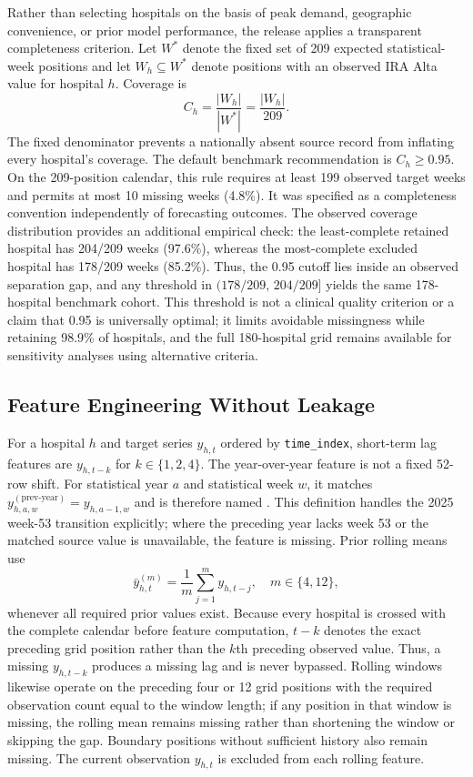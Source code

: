 \documentclass[data,datadescriptor,submit,moreauthors,pdftex]{Definitions/mdpi}
\begin{document}
Rather than selecting hospitals on the basis of peak demand, geographic convenience, or prior model performance, the release applies a transparent completeness criterion. Let $W^{*}$ denote the fixed set of 209 expected statistical-week positions and let $W_h\subseteq W^{*}$ denote positions with an observed IRA Alta value for hospital $h$. Coverage is
\begin{equation}
C_h = \frac{|W_h|}{|W^{*}|}=\frac{|W_h|}{209}.
\end{equation}
The fixed denominator prevents a nationally absent source record from inflating every hospital's coverage. The default benchmark recommendation is $C_h \geq 0.95$. On the 209-position calendar, this rule requires at least 199 observed target weeks and permits at most 10 missing weeks (4.8\%). It was specified as a completeness convention independently of forecasting outcomes. The observed coverage distribution provides an additional empirical check: the least-complete retained hospital has 204/209 weeks (97.6\%), whereas the most-complete excluded hospital has 178/209 weeks (85.2\%). Thus, the 0.95 cutoff lies inside an observed separation gap, and any threshold in $(178/209,\,204/209]$ yields the same 178-hospital benchmark cohort. This threshold is not a clinical quality criterion or a claim that 0.95 is universally optimal; it limits avoidable missingness while retaining 98.9\% of hospitals, and the full 180-hospital grid remains available for sensitivity analyses using alternative criteria.

\subsection{Feature Engineering Without Leakage}

\begingroup\sloppy
For a hospital $h$ and target series $y_{h,t}$ ordered by \texttt{time\_index}, short-term lag features are $y_{h,t-k}$ for $k \in \{1,2,4\}$. The year-over-year feature is not a fixed 52-row shift. For statistical year $a$ and statistical week $w$, it matches $y^{(\mathrm{prev\mbox{-}year})}_{h,a,w}=y_{h,a-1,w}$ and is therefore named . This definition handles the 2025 week-53 transition explicitly; where the preceding year lacks week 53 or the matched source value is unavailable, the feature is missing. Prior rolling means use
\begin{equation}
\bar{y}^{(m)}_{h,t}=\frac{1}{m}\sum_{j=1}^{m}y_{h,t-j}, \quad m \in \{4,12\},
\end{equation}
whenever all required prior values exist. Because every hospital is crossed with the complete calendar before feature computation, $t-k$ denotes the exact preceding grid position rather than the $k$th preceding observed value. Thus, a missing $y_{h,t-k}$ produces a missing lag and is never bypassed. Rolling windows likewise operate on the preceding four or 12 grid positions with the required observation count equal to the window length; if any position in that window is missing, the rolling mean remains missing rather than shortening the window or skipping the gap. Boundary positions without sufficient history also remain missing. The current observation $y_{h,t}$ is excluded from each rolling feature.
\end{document}
